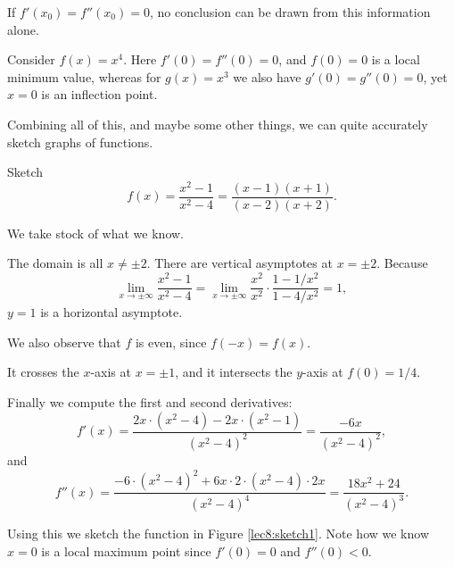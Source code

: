 \begin{remark}
	If $f'(x_0) = f''(x_0) = 0$, no conclusion can be drawn from this information alone.
\end{remark}

\begin{example}
	Consider $f(x) = x^4$. Here $f'(0) = f''(0) = 0$, and $f(0) = 0$ is a local minimum value, whereas for $g(x) = x^3$ we also have $g'(0) = g''(0) = 0$, yet $x = 0$ is an inflection point.
\end{example}


Combining all of this, and maybe some other things, we can quite accurately sketch graphs of functions.

\begin{example}
	Sketch
	\[
		f(x) = \frac{x^2 - 1}{x^2 - 4} = \frac{(x - 1)(x + 1)}{(x - 2)(x + 2)}.
	\]

	\noindent
	We take stock of what we know.

	The domain is all $x \neq \pm 2$. There are vertical asymptotes at $x = \pm 2$. Because
	\[
		\lim_{x \to \pm \infty} \frac{x^2 - 1}{x^2 - 4} = \lim_{x \to \pm \infty} \frac{x^2}{x^2} \cdot \frac{1 - 1/x^2}{1 - 4/x^2} = 1,
	\]
	$y = 1$ is a horizontal asymptote.

	We also observe that $f$ is even, since $f(-x) = f(x)$.

	It crosses the $x$-axis at $x = \pm 1$, and it intersects the $y$-axis at $f(0) = 1/4$.

	Finally we compute the first and second derivatives:
	\[
		f'(x) = \frac{2x \cdot (x^2 - 4) - 2x \cdot (x^2 - 1)}{(x^2 - 4)^2} = \frac{- 6x}{(x^2 - 4)^2},
	\]
	and
	\[
		f''(x) = \frac{-6 \cdot (x^2 - 4)^2 + 6 x \cdot 2 \cdot (x^2 - 4) \cdot 2 x}{(x^2 - 4)^4} = \frac{18x^2 + 24}{(x^2 - 4)^3}.
	\]

	\noindent
	Using this we sketch the function in Figure \ref{lec8:sketch1}. Note how we know $x = 0$ is a local maximum point since $f'(0) = 0$ and $f''(0) < 0$.
\end{example}

